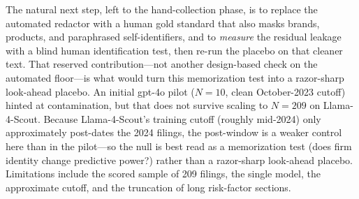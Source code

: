 \documentclass[12pt]{article}
\begin{document}
The natural next step, left to the hand-collection phase, is to replace the automated redactor
with a human gold standard that also masks brands, products, and paraphrased
self-identifiers, and to \emph{measure} the residual leakage with a blind human
identification test, then re-run the placebo on that cleaner text. That reserved
contribution---not another design-based check on the automated floor---is what would turn this
memorization test into a razor-sharp look-ahead placebo. An initial gpt-4o pilot ($N=10$,
clean October-2023 cutoff) hinted at contamination, but that does not survive scaling to
$N=209$ on Llama-4-Scout. Because Llama-4-Scout's training cutoff (roughly mid-2024) only
approximately post-dates the 2024 filings, the post-window is a weaker control here than in
the pilot---so the null is best read as a memorization test (does firm identity change
predictive power?) rather than a razor-sharp look-ahead placebo. Limitations include the
scored sample of 209 filings, the single model, the approximate cutoff, and the truncation of
long risk-factor sections.
\end{document}
